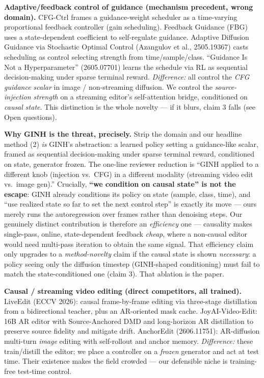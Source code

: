 \documentclass{article}
\begin{document}
\textbf{Adaptive/feedback control of guidance (mechanism precedent, wrong domain).}
CFG-Ctrl frames a guidance-weight scheduler as a time-varying proportional feedback controller
(gain scheduling). Feedback Guidance (FBG) uses a state-dependent coefficient to self-regulate
guidance. Adaptive Diffusion Guidance via Stochastic Optimal Control (Azangulov et al., 2505.19367)
casts scheduling as control selecting strength from time/sample/class. ``Guidance Is Not a
Hyperparameter'' (2605.07701) learns the schedule via RL as sequential decision-making under
sparse terminal reward. \emph{Difference:} all control the \emph{CFG guidance scalar} in
image / non-streaming diffusion. We control the \emph{source-injection strength} on a
streaming editor's self-attention bridge, conditioned on \emph{causal state}. This distinction
is the whole novelty --- if it blurs, claim 3 falls (see Open questions).

\textbf{Why GINH is the threat, precisely.} Strip the domain and our headline method (2) \emph{is}
GINH's abstraction: a learned policy setting a guidance-like scalar, framed as sequential
decision-making under sparse terminal reward, conditioned on state, generator frozen. The
one-line reviewer reduction is ``GINH applied to a different knob (injection vs.\ CFG) in a
different modality (streaming video edit vs.\ image gen).'' Crucially, \textbf{``we condition on
causal state'' is not the escape}: GINH already conditions its policy on state (sample, class,
time), and ``use realized state so far to set the next control step'' is exactly its move ---
ours merely runs the autoregression over frames rather than denoising steps. Our genuinely
distinct contribution is therefore an \emph{efficiency} one --- causality makes single-pass,
online, state-dependent feedback \emph{cheap}, where a non-causal editor would need multi-pass
iteration to obtain the same signal. That efficiency claim only upgrades to a \emph{method-novelty}
claim if the causal state is shown \emph{necessary}: a policy seeing only the diffusion timestep
(GINH-shaped conditioning) must fail to match the state-conditioned one (claim 3). That ablation
is the paper.

\textbf{Causal / streaming video editing (direct competitors, all trained).}
LiveEdit (ECCV 2026): causal frame-by-frame editing via three-stage distillation from a
bidirectional teacher, plus an AR-oriented mask cache. JoyAI-Video-Edit: 16B AR editor with
Source-Anchored DMD and long-horizon AR distillation to preserve source fidelity and mitigate
drift. AnchorEdit (2606.11751): AR-diffusion multi-turn \emph{image} editing with self-rollout
and anchor memory. \emph{Difference:} these train/distill the editor; we place a controller on
a \emph{frozen} generator and act at test time. Their existence makes the field crowded ---
our defensible niche is training-free test-time control.
\end{document}
